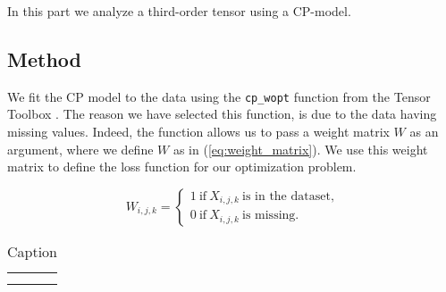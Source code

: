 In this part we analyze a third-order tensor using a CP-model.


\subsection*{Method}

We fit the CP model to the data using the \texttt{cp\_wopt} function from the Tensor Toolbox \cite{tentool}.
The reason we have selected this function, is due to the data having missing values.
Indeed, the function allows us to pass a weight matrix $W$ as an argument, where we define $W$ as in (\ref{eq:weight_matrix}).
We use this weight matrix to define the loss function for our optimization problem.



\begin{equation}
W_{i,j,k} = \begin{cases}
    1 \ \text{if} \ X_{i,j,k} \ \text{is in the dataset,} \\
    0 \ \text{if} \ X_{i,j,k} \ \text{is missing.}
\end{cases}
\label{eq:weight_matrix}
\end{equation}

\begin{table}[]
    \centering
    \begin{tabular}{c|c}
         &  \\
         & 
    \end{tabular}
    \caption{Caption}
    \label{tab:my_label}
\end{table}